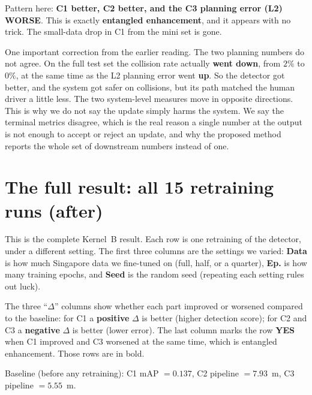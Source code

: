 \documentclass[11pt,a4paper]{article}
\begin{document}
\noindent
Pattern here: \textbf{C1 better, C2 better, and the C3 planning error (L2) WORSE}.
This is exactly \textbf{entangled enhancement}, and it appears with no trick. The
small-data drop in C1 from the mini set is gone.

\vspace{0.4em}
\noindent
One important correction from the earlier reading. The two planning numbers do not
agree. On the full test set the collision rate actually \textbf{went down}, from
$2\%$ to $0\%$, at the same time as the L2 planning error went \textbf{up}. So the
detector got better, and the system got safer on collisions, but its path matched
the human driver a little less. The two system-level measures move in opposite
directions. This is why we do not say the update simply harms the system. We say
the terminal metrics disagree, which is the real reason a single number at the
output is not enough to accept or reject an update, and why the proposed method
reports the whole set of downstream numbers instead of one.

\section{The full result: all 15 retraining runs (after)}

This is the complete Kernel~B result. Each row is one retraining of the detector,
under a different setting. The first three columns are the settings we varied:
\textbf{Data} is how much Singapore data we fine-tuned on (full, half, or a
quarter), \textbf{Ep.} is how many training epochs, and \textbf{Seed} is the
random seed (repeating each setting rules out luck).

The three ``$\Delta$'' columns show whether each part improved or worsened
compared to the baseline: for C1 a \textbf{positive} $\Delta$ is better (higher
detection score); for C2 and C3 a \textbf{negative} $\Delta$ is better (lower
error). The last column marks the row \textbf{YES} when C1 improved and C3
worsened at the same time, which is entangled enhancement. Those rows are in
bold.

Baseline (before any retraining): C1 mAP $=0.137$, C2 pipeline $=7.93$~m,
C3 pipeline $=5.55$~m.
\end{document}
